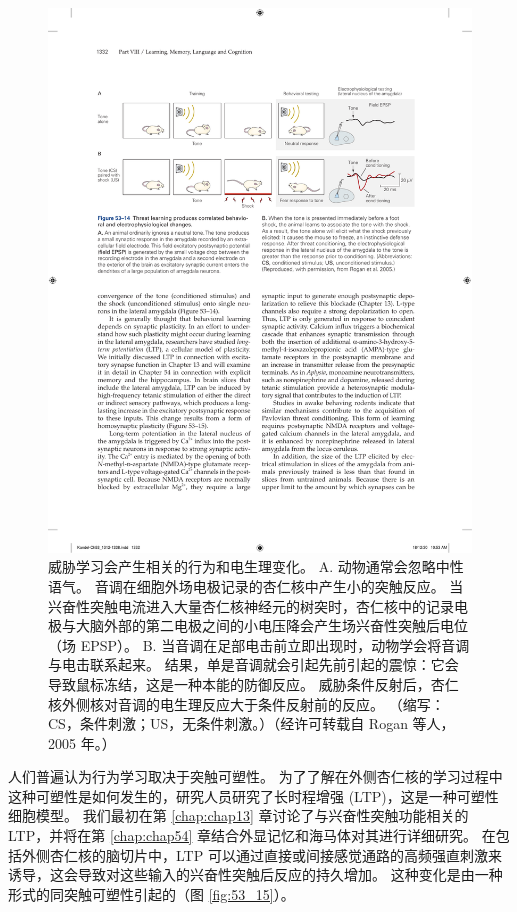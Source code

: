 \begin{figure}[htbp]
	\centering
	\includegraphics[width=0.95\linewidth]{chap53/fig_53_14}
	\caption{威胁学习会产生相关的行为和电生理变化。 A. 动物通常会忽略中性语气。 音调在细胞外场电极记录的杏仁核中产生小的突触反应。 当兴奋性突触电流进入大量杏仁核神经元的树突时，杏仁核中的记录电极与大脑外部的第二电极之间的小电压降会产生场兴奋性突触后电位（场 EPSP）。 B. 当音调在足部电击前立即出现时，动物学会将音调与电击联系起来。 结果，单是音调就会引起先前引起的震惊：它会导致鼠标冻结，这是一种本能的防御反应。 威胁条件反射后，杏仁核外侧核对音调的电生理反应大于条件反射前的反应。 （缩写：CS，条件刺激；US，无条件刺激。）（经许可转载自 Rogan 等人，2005 年。）}
	\label{fig:53_14}
\end{figure}


人们普遍认为行为学习取决于突触可塑性。
为了了解在外侧杏仁核的学习过程中这种可塑性是如何发生的，研究人员研究了长时程增强 (LTP)，这是一种可塑性细胞模型。
我们最初在第 \ref{chap:chap13} 章讨论了与兴奋性突触功能相关的 LTP，并将在第 \ref{chap:chap54} 章结合外显记忆和海马体对其进行详细研究。
在包括外侧杏仁核的脑切片中，LTP 可以通过直接或间接感觉通路的高频强直刺激来诱导，这会导致对这些输入的兴奋性突触后反应的持久增加。
这种变化是由一种形式的同突触可塑性引起的（图 \ref{fig:53_15}）。


